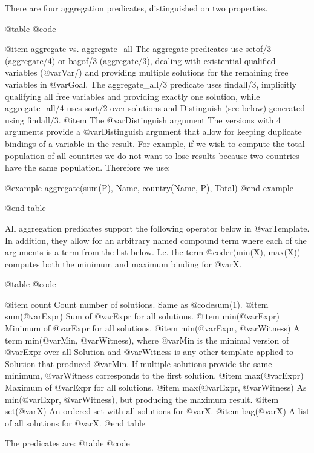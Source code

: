 {{{{{{{{There are four aggregation predicates, distinguished on two properties.

@table @code

@item aggregate vs. aggregate_all
    The aggregate predicates use setof/3 (aggregate/4) or bagof/3
    (aggregate/3), dealing with existential qualified variables
    (@var{Var}/) and providing multiple solutions for the
    remaining free variables in @var{Goal}. The aggregate_all/3
    predicate uses findall/3, implicitly qualifying all free variables
    and providing exactly one solution, while aggregate_all/4 uses
    sort/2 over solutions and Distinguish (see below) generated using
    findall/3. 
@item The @var{Distinguish} argument
    The versions with 4 arguments provide a @var{Distinguish} argument
    that allow for keeping duplicate bindings of a variable in the
    result. For example, if we wish to compute the total population of
    all countries we do not want to lose results because two countries
    have the same population. Therefore we use:

@example
        aggregate(sum(P), Name, country(Name, P), Total)
@end example

@end table

All aggregation predicates support the following operator below in
@var{Template}. In addition, they allow for an arbitrary named compound
term where each of the arguments is a term from the list below. I.e. the
term @code{r(min(X), max(X))} computes both the minimum and maximum
binding for @var{X}.

@table @code

@item count
    Count number of solutions. Same as @code{sum(1)}. 
@item sum(@var{Expr})
    Sum of @var{Expr} for all solutions. 
@item min(@var{Expr})
    Minimum of @var{Expr} for all solutions. 
@item min(@var{Expr}, @var{Witness})
    A term min(@var{Min}, @var{Witness}), where @var{Min} is the minimal version of @var{Expr}
    over all Solution and @var{Witness} is any other template applied to
    Solution that produced @var{Min}. If multiple solutions provide the same
    minimum, @var{Witness} corresponds to the first solution. 
@item max(@var{Expr})
    Maximum of @var{Expr} for all solutions. 
@item max(@var{Expr}, @var{Witness})
    As min(@var{Expr}, @var{Witness}), but producing the maximum result. 
@item set(@var{X})
    An ordered set with all solutions for @var{X}. 
@item bag(@var{X})
    A list of all solutions for @var{X}. 
@end table

The predicates are:
@table @code

}}}}}}}}
